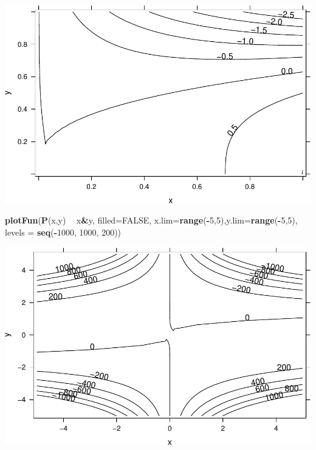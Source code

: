 \documentclass[
]{book}
\newenvironment{Shaded}{\begin{snugshade}}{\end{snugshade}}
\newcommand{\DataTypeTok}[1]{\textcolor[rgb]{0.13,0.29,0.53}{#1}}
\newcommand{\DecValTok}[1]{\textcolor[rgb]{0.00,0.00,0.81}{#1}}
\newcommand{\KeywordTok}[1]{\textcolor[rgb]{0.13,0.29,0.53}{\textbf{#1}}}
\newcommand{\NormalTok}[1]{#1}
\newcommand{\OperatorTok}[1]{\textcolor[rgb]{0.81,0.36,0.00}{\textbf{#1}}}
\newcommand{\OtherTok}[1]{\textcolor[rgb]{0.56,0.35,0.01}{#1}}
\newcommand{\StringTok}[1]{\textcolor[rgb]{0.31,0.60,0.02}{#1}}
\begin{document}
\includegraphics{_bookdown_files/math135_handbook_files/figure-latex/unnamed-chunk-75-1.pdf}

\begin{Shaded}
\begin{Highlighting}[]
\KeywordTok{plotFun}\NormalTok{(}\KeywordTok{P}\NormalTok{(x,y) }\OperatorTok{~}\StringTok{ }\NormalTok{x}\OperatorTok{&}\NormalTok{y, }\DataTypeTok{filled=}\OtherTok{FALSE}\NormalTok{, }\DataTypeTok{x.lim=}\KeywordTok{range}\NormalTok{(}\OperatorTok{-}\DecValTok{5}\NormalTok{,}\DecValTok{5}\NormalTok{),}\DataTypeTok{y.lim=}\KeywordTok{range}\NormalTok{(}\OperatorTok{-}\DecValTok{5}\NormalTok{,}\DecValTok{5}\NormalTok{), }\DataTypeTok{levels =} \KeywordTok{seq}\NormalTok{(}\OperatorTok{-}\DecValTok{1000}\NormalTok{, }\DecValTok{1000}\NormalTok{, }\DecValTok{200}\NormalTok{))}
\end{Highlighting}
\end{Shaded}

\includegraphics{_bookdown_files/math135_handbook_files/figure-latex/unnamed-chunk-75-2.pdf}
\end{document}
